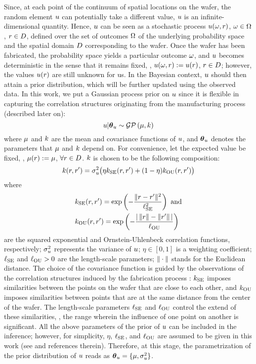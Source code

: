 Since, at each point of the continuum of spatial locations on the wafer, the random element $u$ can potentially take a different value, $u$ is an infinite-dimensional quantity.
Hence, $u$ can be seen as a stochastic process $u(\omega, r)$, $\omega \in \Omega$, $r \in D$, defined over the set of outcomes $\Omega$ of the underlying probability space \cite{durrett2010} and the spatial domain $D$ corresponding to the wafer.
Once the wafer has been fabricated, the probability space yields a particular outcome $\omega$, and $u$ becomes deterministic in the sense that it remains fixed, \ie, $u(\omega, r) := u(r)$, $r \in D$; however, the values $u(r)$ are still unknown for us.
In the Bayesian context, $u$ should then attain a prior distribution, which will be further updated using the observed data. In this work, we put a Gaussian process prior \cite{rasmussen2006} on $u$ since it is flexible in capturing the correlation structures originating from the manufacturing process (described later on):
\[
  \u | \vparam_\u \sim \gaussianp{\fMean}{\fCov}
\]
where $\fMean$ and $\fCov$ are the mean and covariance functions of $u$, and ${\boldsymbol\theta}_u$ denotes the parameters that $\fMean$ and $\fCov$ depend on. For convenience, let the expected value be fixed, \ie, $\fMean{\r} := \mu$, $\forall r \in D$.
$\fCov$ is chosen to be the following composition:
\begin{equation} \elabel{covariance-function}
  \fCov{\r, \r'} = \sigma_\u^2 \big( \eta \fCov_\SE(\r, \r') + (1 - \eta) \fCov_\OU(\r, \r') \big)
\end{equation}
where
\begin{align*}
  & \fCov_\SE(\r, \r') = \exp\left(-\frac{\norm{\r - \r'}^2}{\ell_\SE^2}\right) \text{ and} \\
  & \fCov_\OU(\r, \r') = \exp\left(- \frac{\abs{\,\norm{\r} - \norm{\r'}\,}}{\ell_\OU} \right)
\end{align*}
are the squared exponential and Ornstein-Uhlenbeck correlation functions, respectively; $\sigma_u^2$ represents the variance of $u$; $\eta \in [0, 1]$ is a weighting coefficient; $\ell_{\text{SE}}$ and $\ell_{\text{OU}} > 0$ are the length-scale parameters; $\| \cdot \|$ stands for the Euclidean distance.
The choice of the covariance function is guided by the observations of the correlation structures induced by the fabrication process \cite{cheng2011}: $\fCov_\SE$ imposes similarities between the points on the wafer that are close to each other, and $\fCov_\OU$ imposes similarities between points that are at the same distance from the center of the wafer.
The length-scale parameters $\ell_{\text{SE}}$ and $\ell_{\text{OU}}$ control the extend of these similarities, \ie, the range wherein the influence of one point on another is significant. All the above parameters of the prior of $u$ can be included in the inference; however, for simplicity, $\eta$, $\ell_{\text{SE}}$, and $\ell_{\text{OU}}$ are assumed to be given in this work (see \cite{marzouk2009} and references therein). Therefore, at this stage, the parametrization of the prior distribution of $u$ reads as ${\boldsymbol\theta}_u = \{ \mu, \sigma_u^2 \}$.

